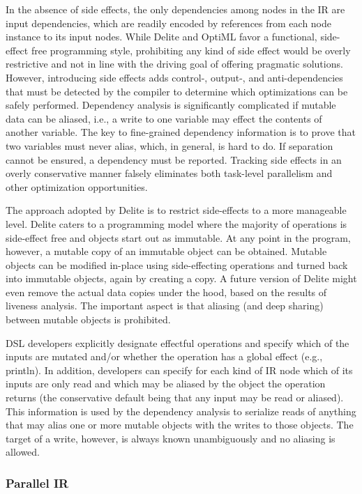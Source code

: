 In the absence of side effects, the only dependencies among
nodes in the IR are input dependencies, which are readily
encoded by references from each node instance to its input
nodes. While Delite and OptiML favor a functional, side-effect
free programming style, prohibiting any kind of side effect
would be overly restrictive and not in line with the driving goal
of offering pragmatic solutions. However, introducing side
effects adds control-, output-, and anti-dependencies that must
be detected by the compiler to determine which optimizations
can be safely performed. Dependency analysis is significantly
complicated if mutable data can be aliased, i.e., a write to one
variable may effect the contents of another variable. The key
to fine-grained dependency information is to prove that two
variables must never alias, which, in general, is hard to do. If
separation cannot be ensured, a dependency must be reported.
Tracking side effects in an overly conservative manner falsely
eliminates both task-level parallelism and other optimization
opportunities.

The approach adopted by Delite is to restrict side-effects to a
more manageable level. Delite caters to a programming model
where the majority of operations is side-effect free and objects
start out as immutable. At any point in the program, however,
a mutable copy of an immutable object can be obtained.
Mutable objects can be modified in-place using side-effecting
operations and turned back into immutable objects, again by
creating a copy. A future version of Delite might even remove
the actual data copies under the hood, based on the results of
liveness analysis. The important aspect is that aliasing (and
deep sharing) between mutable objects is prohibited.

DSL developers explicitly designate effectful operations and
specify which of the inputs are mutated and/or whether the
operation has a global effect (e.g., println). In addition,
developers can specify for each kind of IR node which of
its inputs are only read and which may be aliased by the
object the operation returns (the conservative default being
that any input may be read or aliased). This information is
used by the dependency analysis to serialize reads of anything
that may alias one or more mutable objects with the writes to
those objects. The target of a write, however,  is always known
unambiguously and no aliasing is allowed.


\subsubsection{Parallel IR}

